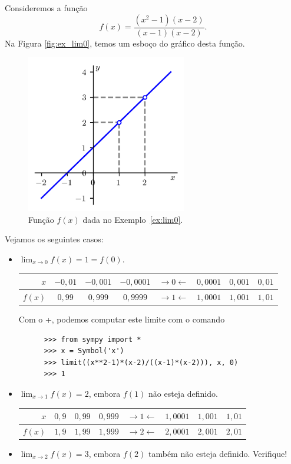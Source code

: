 \begin{ex}\label{ex:lim0}
  Consideremos a função
  \begin{equation}
    f(x) = \frac{(x^2-1)(x-2)}{(x-1)(x-2)}.
  \end{equation}
  Na Figura \ref{fig:ex_lim0}, temos um esboço do gráfico desta função.

  \begin{figure}[htb]
    \centering
    \includegraphics[width=2.75in]{./cap_lim/dados/fig_ex_lim0/fig.png}
    \caption{Função $f(x)$ dada no Exemplo~\ref{ex:lim0}.}
    \label{cap_lim_sec_lim:fig:ex_lim0}
  \end{figure}


  Vejamos os seguintes casos:
  \begin{itemize}
  \item $\displaystyle \lim_{x\to 0} f(x) = 1 = f(0)$.
    
    \begin{tabular}{r|ccc|c|ccc}
      $x$ & $-0,01$ & $-0,001$ & $-0,0001$ & $\rightarrow 0 \leftarrow$ & $0,0001$ & $0,001$ & $0,01$\\\hline
      $f(x)$ & $0,99$ & $0,999$ & $0,9999$ & $\rightarrow 1 \leftarrow$ & $1,0001$ & $1,001$ & $1,01$
    \end{tabular}

    \ifispython
    Com o {\python}+{\sympy}, podemos computar este limite com o comando
    \begin{lstlisting}
      >>> from sympy import *
      >>> x = Symbol('x')
      >>> limit((x**2-1)*(x-2)/((x-1)*(x-2))), x, 0)
      >>> 1
    \end{lstlisting}
    \fi
  \item $\displaystyle \lim_{x\to 1} f(x) = 2$, embora $f(1)$ não esteja definido.
    
    \begin{tabular}{r|ccc|c|ccc}
      $x$ & $0,9$ & $0,99$ & $0,999$ & $\rightarrow 1 \leftarrow$ & $1,0001$ & $1,001$ & $1,01$\\\hline
      $f(x)$ & $1,9$ & $1,99$ & $1,999$ & $\rightarrow 2 \leftarrow$ & $2,0001$ & $2,001$ & $2,01$
    \end{tabular}
  \item $\displaystyle \lim_{x\to 2} f(x) = 3$, embora $f(2)$ também não esteja definido. Verifique!
  \end{itemize}
\end{ex}

